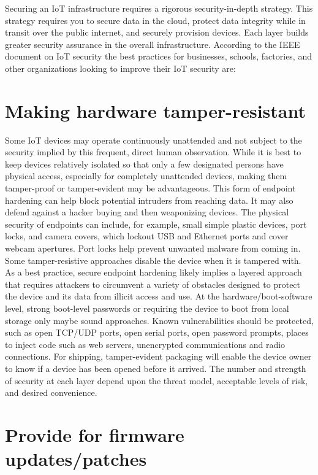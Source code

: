 \documentclass[12pt]{report}
\begin{document}
Securing an IoT infrastructure requires a rigorous security-in-depth strategy. 
This strategy requires you to secure data in the cloud, protect data integrity 
while in transit over the public internet, and securely provision devices. 
Each layer builds greater security assurance in the overall infrastructure.
According to the IEEE document on IoT security the best practices for businesses, 
schools, factories, and other organizations looking to improve their IoT security are:

\section{Making hardware tamper-resistant}

Some IoT devices may operate continuously unattended and not subject to the security 
implied by this frequent, direct human observation. While it is best to keep devices 
relatively isolated so that only a few designated persons have physical access, 
especially for completely unattended devices, making them tamper-proof or 
tamper-evident may be advantageous. This form of endpoint hardening can help 
block potential intruders from reaching data. It may also defend against a hacker 
buying and then weaponizing devices. The physical security of endpoints can include, 
for example, small simple plastic devices, port locks, and camera covers, 
which lockout USB and Ethernet ports and cover webcam apertures. 
Port locks help prevent unwanted malware from coming in. Some tamper-resistive 
approaches disable the device when it is tampered with. As a best practice, 
secure endpoint hardening likely implies a layered approach that requires 
attackers to circumvent a variety of obstacles designed to protect the device 
and its data from illicit access and use. At the hardware/boot-software level, 
strong boot-level passwords or requiring the device to boot from local storage 
only maybe sound approaches. Known vulnerabilities should be protected, such as 
open TCP/UDP ports, open serial ports, open password prompts, places to inject 
code such as web servers, unencrypted communications and radio connections. 
For shipping, tamper-evident packaging will enable the device owner to know if a 
device has been opened before it arrived. The number and strength of security at 
each layer depend upon the threat model, acceptable levels of risk, and desired 
convenience.

\section{Provide for firmware updates/patches}
\end{document}
